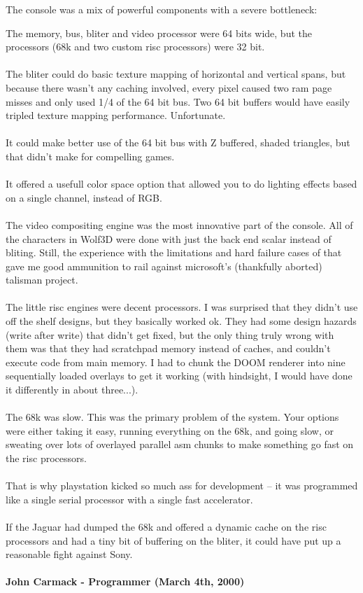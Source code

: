 \documentclass[book.tex]{subfiles}
\begin{document}
The console was a mix of powerful components with a severe bottleneck: 
\par
\begin{fancyquotes}
The memory, bus, bliter and video processor were 64 bits wide, but the processors (68k and two custom risc processors) were 32 bit.\\
\\
The bliter could do basic texture mapping of horizontal and vertical spans, but because there wasn't any caching involved, every pixel caused two ram page misses and only used 1/4 of the 64 bit bus. Two 64 bit buffers would have easily tripled texture mapping performance. Unfortunate.\\
\\
It could make better use of the 64 bit bus with Z buffered, shaded triangles, but that didn't make for compelling games.\\
\\
It offered a usefull color space option that allowed you to do lighting effects based on a single channel, instead of RGB.\\
\\
The video compositing engine was the most innovative part of the console. All of the characters in Wolf3D were done with just the back end scalar instead of bliting. Still, the experience with the limitations and hard failure cases of that gave me good ammunition to rail against microsoft's (thankfully aborted) talisman project.\\
\\
The little risc engines were decent processors. I was surprised that they didn't use off the shelf designs, but they basically worked ok. They had some design hazards (write after write) that didn't get fixed, but the only thing truly wrong with them was that they had scratchpad memory instead of caches, and couldn't execute code from main memory. I had to chunk the DOOM renderer into nine sequentially loaded overlays to get it working (with hindsight, I would have done it differently in about three...).\\
\\
The 68k was slow. This was the primary problem of the system. Your options were either taking it easy, running everything on the 68k, and going slow, or sweating over lots of overlayed parallel asm chunks to make something go fast on the risc processors.\\
\\
That is why playstation kicked so much ass for development -- it was programmed like a single serial processor with a single fast accelerator.\\
\\
If the Jaguar had dumped the 68k and offered a dynamic cache on the risc processors and had a tiny bit of buffering on the bliter, it could have put up a reasonable fight against Sony.\\
\\
\textbf{John Carmack - Programmer (March 4th, 2000)}
\end{fancyquotes}
\end{document}

